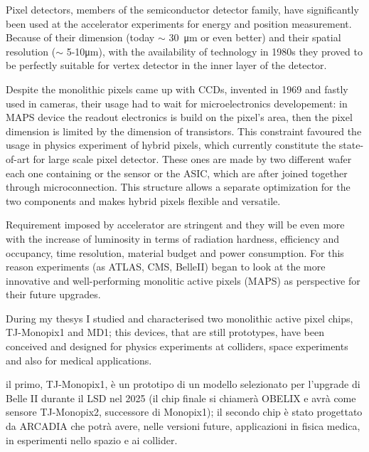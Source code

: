Pixel detectors, members of the semiconductor detector family, have significantly been used at the accelerator experiments for energy and position measurement.
Because of their dimension (today $\sim$ \SI{30}{\um} or even better) and their spatial resolution ($\sim$ 5-10\si{\um}), with the availability of technology in 1980s they proved to be perfectly suitable for vertex detector in the inner layer of the detector.

Despite the monolithic pixels came up with CCDs, invented in 1969 and fastly used in cameras, their usage had to wait for microelectronics developement: in MAPS device the readout electronics is build on the pixel's area, then the pixel dimension is limited by the dimension of transistors.
This constraint favoured the usage in physics  experiment of hybrid pixels, which currently constitute the state-of-art for large scale pixel detector. These ones are made by two different wafer each one containing or the sensor or the ASIC, which are after joined together through microconnection. 
This structure allows a separate optimization for the two components and makes hybrid pixels flexible and versatile. 

Requirement imposed by accelerator are stringent and they will be even more with the increase of luminosity in terms of radiation hardness, efficiency and occupancy, time resolution, material budget and power consumption.
For this reason experiments (as ATLAS, CMS, BelleII) began to look at the more innovative and well-performing monolitic active pixels (MAPS) as perspective for their future upgrades. 




During my thesys I studied and characterised two monolithic active pixel chips, TJ-Monopix1 and MD1; this devices, that are still prototypes, have been conceived and designed for physics experiments at colliders, space experiments and also for medical applications.


il primo, TJ-Monopix1, è un prototipo di un modello selezionato per l'upgrade di Belle II durante il LSD nel 2025 (il chip finale si chiamerà OBELIX e avrà come sensore TJ-Monopix2, successore di Monopix1); il secondo chip è stato progettato da ARCADIA che potrà avere, nelle versioni future, applicazioni in fisica medica, in esperimenti nello spazio e ai collider. 


